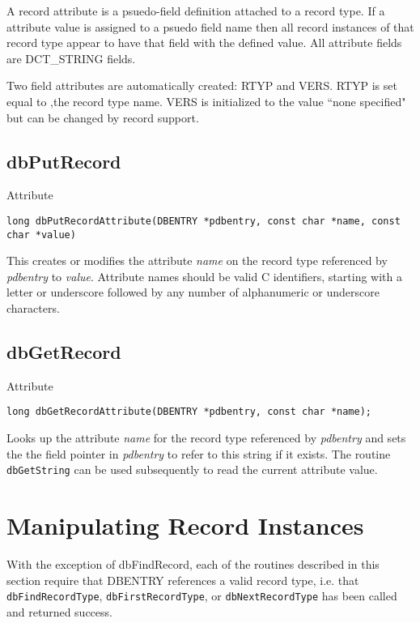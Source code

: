 A record attribute is a psuedo-field definition attached to a record type. If a attribute value is assigned to a psuedo field 
name then all record instances of that record type appear to have that field with the defined value. All attribute fields are 
DCT\_STRING fields.

Two field attributes are automatically created: RTYP and VERS. RTYP is set equal to ,the record type name. VERS is 
initialized to the value ``none specified" but can be changed by record support.

\subsection{dbPutRecord}

Attribute

\begin{verbatim}long dbPutRecordAttribute(DBENTRY *pdbentry, const char *name, const char *value)
\end{verbatim}This creates or modifies the attribute \emph{name} on the record type referenced by \emph{pdbentry} to \emph{value}. Attribute names should be 
valid C identifiers, starting with a letter or underscore followed by any number of alphanumeric or underscore characters.

\subsection{dbGetRecord}

Attribute

\begin{verbatim}long dbGetRecordAttribute(DBENTRY *pdbentry, const char *name);
\end{verbatim}Looks up the attribute \emph{name} for the record type referenced by \emph{pdbentry} and sets the the field pointer in \emph{pdbentry} to refer to 
this string if it exists. The routine \verb|dbGetString| can be used subsequently to read the current attribute value.

\section{Manipulating Record Instances}

With the exception of dbFindRecord, each of the routines described in this section require that DBENTRY references a 
valid record type, i.e. that \verb|dbFindRecordType|, \verb|dbFirstRecordType|, or \verb|dbNextRecordType| has been called 
and returned success.

